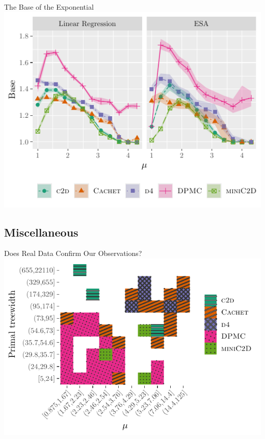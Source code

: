 \documentclass{beamer}
\begin{document}
\begin{frame}{The Base of the Exponential}
  \centering
  \includegraphics{linearbase2.pdf}
\end{frame}

\subsection{Miscellaneous}

\begin{frame}{Does Real Data Confirm Our Observations?}
  \centering
  \includegraphics{real}
\end{frame}
\end{document}
